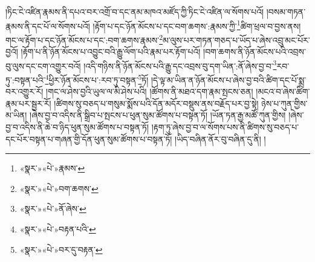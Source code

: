 །ཏིང་ངེ་འཛིན་རྣམས་ནི་དཔའ་བར་འགྲོ་བ་དང་ནམ་མཁའ་མཛོད་ཀྱི་ཏིང་ངེ་འཛིན་ལ་སོགས་པའོ། །བསམ་གཏན་རྣམས་ནི་དང་པོ་ལ་སོགས་པའོ། །རྟོག་པ་དང་ཉོན་མོངས་པ་དང་བག་ཆགས་:རྣམས་ཀྱི་\footnote{«སྣར་»«པེ་»རྣམས་}ཚིག་ཕྲལ་བ་བྱས་ནས། གང་ལ་རྟོག་པ་དང་ཉོན་མོངས་པ་དང་:བག་ཆགས་རྣམས་\footnote{«སྣར་»«པེ་»བག་ཆགས་}མ་ལུས་པར་གཏན་གཅད་པ་ཡོད་པ་ཞེས་འབྲུ་མང་པོར་བྱའོ། །རྟོག་པ་ནི་ཉོན་མོངས་པ་འབྱུང་བའི་རྒྱུ་ལོག་པའི་རྣམ་པར་རྟོག་པའོ། །བག་ཆགས་ནི་ཉོན་མོངས་པའི་འབྲས་བུ་ལུས་དང་ངག་འགྱུར་བའོ། །འདི་གཉིས་ནི་ཉོན་མོངས་པའི་རྒྱུ་དང་འབྲས་བུ་དག་ཡིན་:ནོ་ཞེས་བྱ་བ་\footnote{«སྣར་»«པེ་»ནོ་ཞེས་}རབ་ཏུ་:བསྟན་པའི་\footnote{«སྣར་»«པེ་»བརྟན་པའི་}ཕྱིར་ཉོན་མོངས་པ་:རབ་ཏུ་བསྟན་\footnote{«སྣར་»«པེ་»བར་དུ་བརྟན་}ཏོ། །དེ་ལྟ་མ་ཡིན་ན་ཉོན་མོངས་པ་ཞེས་བྱ་བའི་ཚིག་དང་པོ་སྨྲ་བར་འགྱུར་རོ། །གང་ལ་ཤེས་བྱའི་ཡུལ་ལ་མི་ཤེས་པའི། །ཚོགས་ནི་མཐའ་དག་རྣམ་སྤངས་ཅན། །མངའ་བ་ཞེས་ཚིག་རྣམ་པར་སྦྱར་རོ། །ཚིགས་སུ་བཅད་པ་གསུམ་སྨོས་པའི་དོན་མདོར་བསྡུས་ནས་བརྗོད་པར་བྱ་སྟེ། ཉེས་པ་ཀུན་གྱིས་མ་ཡིན། །ཞེས་བྱ་བ་འདིས་ནི་སྒྲིབ་པ་སྤངས་པ་ཕུན་སུམ་ཚོགས་པ་བསྟན་ཏོ། །ཡོན་ཏན་རྒྱ་མཚོ་ཀུན་གྱིས། །ཞེས་བྱ་བ་འདིས་ནི་ཆེ་བ་ཉིད་ཕུན་སུམ་ཚོགས་པ་བསྟན་ཏོ། །རྟག་ཏུ་ཞེས་བྱ་བ་ལ་སོགས་པས་ནི་ཚིགས་སུ་བཅད་པ་དང་པོར་བསྟན་པ་གཞན་གྱི་དོན་ཕུན་སུམ་ཚོགས་པ་བསྟན་ཏོ། །ཡིད་བཞིན་ནོར་བུ་བཞིན་དུ་ནི། །
